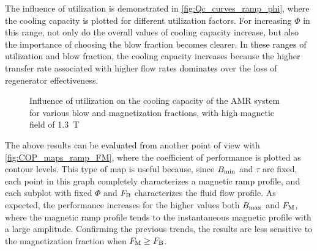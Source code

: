 \documentclass[referee]{svjour3}
\newcommand{\bmax}{\ensuremath{{B}\ped{max}}}
\newcommand{\bmin}{\ensuremath{{B}\ped{min}}}
\begin{document}
The influence of utilization is demonstrated in \autoref{fig:Qc_curves_ramp_phi}, where the cooling capacity \textcolor{black}{is} plotted for different utilization factors. For increasing $\Phi$ in this range, not only do the overall values of cooling capacity increase, but also the importance of choosing the blow fraction becomes clearer. In \textcolor{black}{these ranges} of utilization and blow fraction,  the cooling capacity increases because the higher transfer rate associated with higher flow rates \textcolor{black}{dominates} over the loss of regenerator effectiveness.

\begin{figure}[!ht]
  \centering
\quad
  \caption{Influence of utilization on the cooling capacity of the AMR system for  various blow and magnetization fractions, with high magnetic field of \SI{1.3}{\tesla}}
  \label{fig:Qc_curves_ramp_phi}
\end{figure}

The \textcolor{black}{above} results can be \textcolor{black}{evaluated from} another point of view with \autoref{fig:COP_maps_ramp_FM}, where the coefficient of performance is plotted as contour levels. This type of map is useful because, since $\bmin$ and $\tau$ are fixed, each point in this graph completely characterizes a magnetic \textcolor{black}{ramp} profile, and each subplot with fixed $\Phi$ and $F_{\mathrm{B}}$ characterizes the fluid flow profile. As expected, the performance increases for the higher values both $\bmax$ and $F_{\mathrm{M}}$, where the  magnetic \textcolor{black}{ramp} profile tends to the instantaneous magnetic profile with a large amplitude. Confirming the previous trends, the results are less sensitive to the magnetization fraction when $F_{\mathrm{M}} \ge F_{\mathrm{B}}$. 
\end{document}
